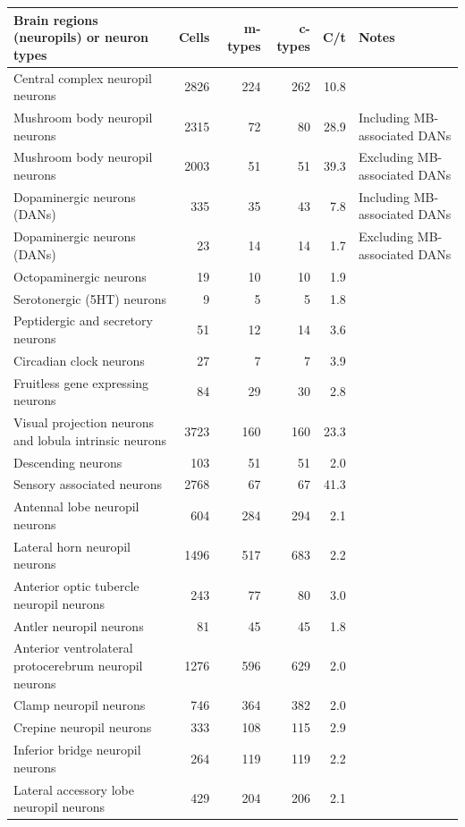\documentclass{article}
\begin{document}
\begin{center}\footnotesize
\begin{longtable}{lrrrrl}
\textbf{Brain regions (neuropils) or neuron types} & \textbf{Cells} & \textbf{m-types} & \textbf{c-types} & \textbf{C/t} & \textbf{Notes} \\
\hline
Central complex neuropil neurons & 2826 & 224 & 262 & 10.8 &  \\
Mushroom body neuropil neurons & 2315 & 72 & 80 & 28.9 & Including MB-associated DANs \\
Mushroom body neuropil neurons & 2003 & 51 & 51 & 39.3 & Excluding MB-associated DANs \\
Dopaminergic neurons (DANs) & 335 & 35 & 43 & 7.8 & Including MB-associated DANs \\
Dopaminergic neurons (DANs) & 23 & 14 & 14 & 1.7 & Excluding MB-associated DANs \\
Octopaminergic neurons & 19 & 10 & 10 & 1.9 &  \\
Serotonergic (5HT) neurons & 9 & 5 & 5 & 1.8 &  \\
Peptidergic and secretory neurons & 51 & 12 & 14 & 3.6 &  \\
Circadian clock neurons & 27 & 7 & 7 & 3.9 &  \\
Fruitless gene expressing neurons & 84 & 29 & 30 & 2.8 &  \\
Visual projection neurons and lobula intrinsic neurons & 3723 & 160 & 160 & 23.3 &  \\
Descending neurons & 103 & 51 & 51 & 2.0 &  \\
Sensory associated neurons & 2768 & 67 & 67 & 41.3 &  \\
Antennal lobe neuropil neurons & 604 & 284 & 294 & 2.1 &  \\
Lateral horn neuropil neurons & 1496 & 517 & 683 & 2.2 &  \\
Anterior optic tubercle neuropil neurons & 243 & 77 & 80 & 3.0 &  \\
Antler neuropil neurons & 81 & 45 & 45 & 1.8 &  \\
Anterior ventrolateral protocerebrum neuropil neurons & 1276 & 596 & 629 & 2.0 &  \\
Clamp neuropil neurons & 746 & 364 & 382 & 2.0 &  \\
Crepine neuropil neurons & 333 & 108 & 115 & 2.9 &  \\
Inferior bridge neuropil neurons & 264 & 119 & 119 & 2.2 &  \\
Lateral accessory lobe neuropil neurons & 429 & 204 & 206 & 2.1 &  \\

\end{longtable}
\end{center}
\end{document}
